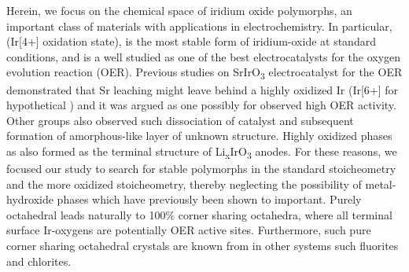 Herein, we focus on the chemical space of iridium oxide polymorphs,
an important class of materials with applications in electrochemistry.
%
In particular, \rIrOtwo (Ir[4+] oxidation state), is the most stable form  %
of iridium-oxide at standard conditions,
and is a well studied as one of the best electrocatalysts for the oxygen evolution reaction (OER).
\cite{Seitz2016,Lee2012a,McCrory2015,Trotochaud2012,Danilovic2014,Carmo2013,Miles1978,Beni1979}
%
Previous studies on SrIrO\textsubscript{3} electrocatalyst for the OER demonstrated that Sr leaching might leave behind a highly oxidized Ir (Ir[6+] for hypothetical \IrOthree) and it was argued as one possibly for observed high OER activity.\cite{Seitz2016}
%
Other groups also observed such dissociation of \IrOx catalyst and subsequent formation of amorphous-like layer of unknown structure. \cite{Pearce2017}
%
Highly oxidized \IrOthree phases as also formed as the terminal structure of Li\textsubscript{x}IrO\textsubscript{3} anodes.\cite{Pearce2017}
%
For these reasons, we focused our study to search for stable polymorphs in the standard \IrOtwo stoicheometry and the more oxidized \IrOthree stoicheometry,
thereby neglecting the possibility of metal-hydroxide phases which have previously been shown to important.
%
Purely octahedral \IrOthree leads naturally to 100\% corner sharing octahedra,
where all terminal surface Ir-oxygens are potentially OER active sites.
%
Furthermore, such pure corner sharing octahedral crystals are known from in other systems such fluorites and chlorites.



